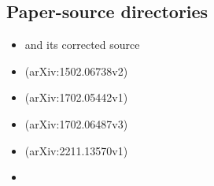 \documentclass[11pt]{article}
\theoremstyle{definition}
\theoremstyle{remark}
\begin{document}
\subsection*{Paper-source directories}
\begin{itemize}[leftmargin=8mm]
\item {} and its corrected source
\item {} (arXiv:1502.06738v2)
\item {} (arXiv:1702.05442v1)
\item {} (arXiv:1702.06487v3)
\item {} (arXiv:2211.13570v1)
\item {}
\end{itemize}
\end{document}
